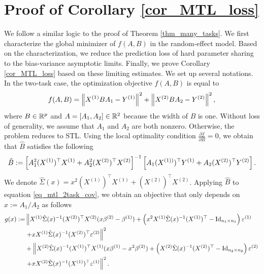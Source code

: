 \section{Proof of Corollary \ref{cor_MTL_loss}}\label{app_iso_cov}

We follow a similar logic to the proof of Theorem \ref{thm_many_tasks}.
We first characterize the global minimizer of $f(A, B)$ in the random-effect model.
Based on the characterization, we reduce the prediction loss of hard parameter sharing to the bias-variance asymptotic limits.
Finally, we prove Corollary \ref{cor_MTL_loss} based on these limiting estimates.
We set up several notations.
In the two-task case, the optimization objective $f(A, B)$ is equal to
	\begin{align}
		f(A, B) =   \left\| X^{(1)} B A_1 - Y^{(1)} \right\|^2+ \left\| X^{(2)} B A_2 - Y^{(2)} \right\|^2, \label{eq_mtl_2task_cov}
	\end{align}
	where $B \in \mathbb{R}^{p}$ and $A = [A_1, A_2]\in \mathbb{R}^{2}$ because the width of $B$ is one.
Without loss of generality, we assume that $A_1$ and $A_2$ are both nonzero.
Otherwise, the problem reduces to STL. %
Using the local optimality condition $\frac{\partial f}{\partial B} = 0$, we obtain that $\hat{B}$ satisfies the following
	\begin{align}
		\hat{B} \define  \left[A_1^2 (X^{(1)})^{\top}X^{(1)} + A_2^2 (X^{(2)})^{\top}X^{(2)}\right]^{-1} \left[A_1 (X^{(1))})^{\top}Y^{(1)} + A_2 (X^{(2)})^{\top}Y^{(2)}\right]. \label{eq_Bhat_2task} %
	\end{align}
We denote $\hat \Sigma(x)= x^2 (X^{(1)})^\top X^{(1)}  + (X^{(2)})^\top X^{(2)}$.
Applying $\hat B$ to equation \eqref{eq_mtl_2task_cov}, we obtain an objective that only depends on $x:=A_1/A_2$ as follows %
 \begin{align}
		 g(x) := & \left\| X^{(1)} \hat\Sigma(x)^{-1} (X^{(2)})^\top X^{(2)} (x\beta^{(2)}-\beta^{(1)})+ \left(x^2 X^{(1)}\hat \Sigma(x)^{-1} (X^{(1)})^\top-\operatorname{Id}_{n_1\times n_1}\right)\varepsilon^{(1)} \right. \nonumber\\
			& \left. + x X^{(1)}\hat \Sigma(x)^{-1} (X^{(2)})^\top \varepsilon^{(2)} \right\|^2 \nonumber\\
		  & + \left\| X^{(2)} \hat \Sigma(x)^{-1} (X^{(1)})^\top X^{(1)} (x\beta^{(1)}-x^2\beta^{(2)})+ \left(X^{(2)}\hat\Sigma(x)^{-1} (X^{(2)})^\top-\operatorname{Id}_{n_2\times n_2}\right)\varepsilon^{(2)} \right. \nonumber\\
		  &\left. + x X^{(2)}\hat \Sigma(x)^{-1} (X^{(1)})^\top \varepsilon^{(1)} \right\|^2. \label{eq_mtl_A12}
	\end{align}
